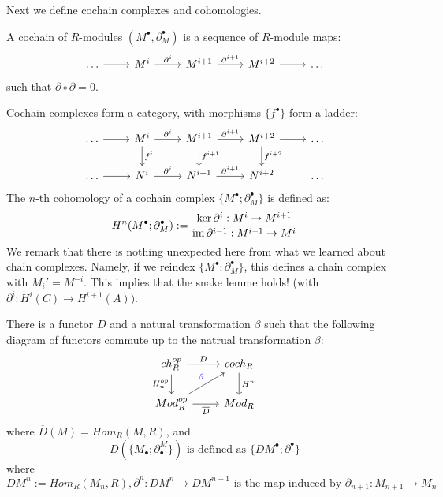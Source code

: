 Next we define cochain complexes and cohomologies. 
\begin{defn}[cochain]
    A cochain of $R$-modules $(M^\bullet, \partial_M^\bullet)$ is a sequence of $R$-module maps:
    \[\begin{tikzcd}
        \dots & {M^i} & {M^{i+1}} & {M^{i+2}} & \dots
        \arrow[from=1-1, to=1-2]
        \arrow["{\partial^i}", from=1-2, to=1-3]
        \arrow["{\partial^{i+1}}", from=1-3, to=1-4]
        \arrow[from=1-4, to=1-5]
    \end{tikzcd}\]
    such that $\partial\circ\partial=0$.
\end{defn}
Cochain complexes form a category, with morphisms $\{f^\bullet\}$ form a ladder: 
\[\begin{tikzcd}
	\dots & {M^i} & {M^{i+1}} & {M^{i+2}} & \dots \\
	\dots & {N^i} & {N^{i+1}} & {N^{i+2}} & \dots
	\arrow[from=1-1, to=1-2]
	\arrow["{\partial^i}", from=1-2, to=1-3]
	\arrow["{f^i}", from=1-2, to=2-2]
	\arrow["{\partial^{i+1}}", from=1-3, to=1-4]
	\arrow["{f^{i+1}}", from=1-3, to=2-3]
	\arrow[from=1-4, to=1-5]
	\arrow["{f^{i+2}}", from=1-4, to=2-4]
	\arrow[from=2-1, to=2-2]
	\arrow["{\partial^i}", from=2-2, to=2-3]
	\arrow["{\partial^{i+1}}", from=2-3, to=2-4]
\end{tikzcd}\]
The $n$-th cohomology of a cochain complex $\{M^\bullet; \partial_M^\bullet\}$ is defined as:
\begin{equation*}
    H^n(M^\bullet;\partial_M^\bullet):=\frac{\ker\partial^i: M^i\to M^{i+1}}{\operatorname{im}\partial^{i-1}: M^{i-1}\to M^i}
\end{equation*}
We remark that there is nothing unexpected here from what we learned about chain complexes. Namely, if we reindex $\{M^\bullet;\partial_M^\bullet\}$, this defines a chain complex with $M_i'=M^{-i}$. This implies that the snake lemme holds! (with $\partial^i:H^i(C)\to H^{i+1}(A)).$
\begin{thm}
    There is a functor $D$ and a natural transformation  $\beta$ such that the following diagram of functors commute up to the natrual transformation $\beta$:
    \[\begin{tikzcd}
        {ch_R^{op}} & {coch_R} \\
        {Mod_R^{op}} & {Mod_R}
        \arrow["D", from=1-1, to=1-2]
        \arrow["{H_n^{op}}"', from=1-1, to=2-1]
        \arrow["{H^n}", from=1-2, to=2-2]
        \arrow["{\textcolor{blue}{\beta}}", from=2-1, to=1-2]
        \arrow["{\overline{D}}"', from=2-1, to=2-2]
    \end{tikzcd}\]
    where $\overline{D}(M)=Hom_R(M,R)$, and 
    \begin{equation*}
        D(\{M_\bullet;\partial_\bullet^M\}) \text{ is defined as } \{DM^\bullet; \partial^\bullet\}
    \end{equation*}
    where 
    \begin{equation*}
        DM^n:=Hom_R(M_n,R), \partial^n: DM^n\to DM^{n+1} \text{ is the map induced by } \partial_{n+1}: M_{n+1}\to M_n
    \end{equation*}
\end{thm}
